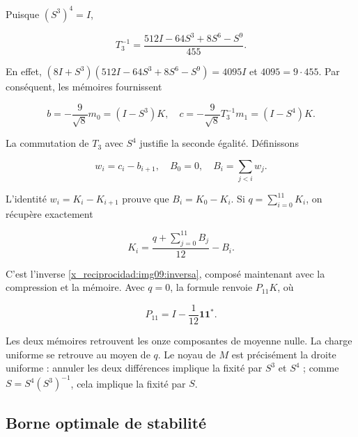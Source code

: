 Puisque \((S^3)^4=I\),



\begin{equation}
T_3^{-1}=\frac{512I-64S^3+8S^6-S^9}{455}.
\label{x_reciprocidad:nuc11:eq:3}
\end{equation}



En effet,
\((8I+S^3)(512I-64S^3+8S^6-S^9)=4095I\)
et \(4095=9\cdot455\).
Par conséquent, les mémoires fournissent



\begin{equation}
b=-\frac9{\sqrt8}m_0=(I-S^3)K,
\quad c=-\frac9{\sqrt8}T_3^{-1}m_1=(I-S^4)K.
\label{x_reciprocidad:nuc11:eq:4}
\end{equation}



La commutation de \(T_3\) avec \(S^4\) justifie la seconde égalité.
Définissons



\[
w_i=c_i-b_{i+1},\quad B_0=0,\quad
B_i=\sum_{j<i}w_j.
\]



L’identité \(w_i=K_i-K_{i+1}\) prouve que \(B_i=K_0-K_i\).
Si \(q=\sum_{i=0}^{11}K_i\), on récupère exactement



\begin{equation}
K_i=\frac{q+\sum_{j=0}^{11}B_j}{12}-B_i.
\label{x_reciprocidad:nuc11:eq:5}
\end{equation}



C’est l’inverse \eqref{x_reciprocidad:img09:inversa}, composé maintenant avec la
compression et la mémoire. Avec \(q=0\), la formule renvoie
\(P_{11}K\), où



\[
P_{11}=I-\frac1{12}\mathbf1\mathbf1^*.
\]



Les deux mémoires retrouvent les onze composantes de moyenne nulle.
La charge uniforme se retrouve au moyen de \(q\).
Le noyau de \(M\) est précisément la droite uniforme :
annuler les deux différences implique la fixité par \(S^3\) et \(S^4\) ;
comme \(S=S^4(S^3)^{-1}\), cela implique la fixité par \(S\).

\subsection{Borne optimale de stabilité}

